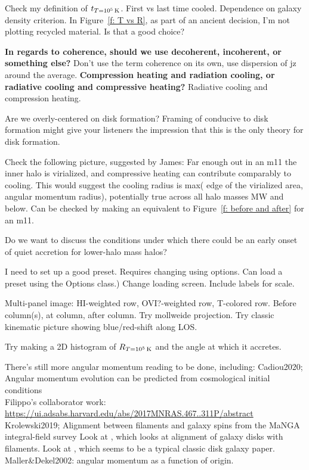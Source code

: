 \documentclass[fleqn,usenatbib]{mnras}
\newcommand{\Rcon}{R_{T=10^5\,{\rm K}}}
\newcommand{\tcon}{t_{T=10^5\,{\rm K}}}
\begin{document}
Check my definition of $\tcon$.
First vs last time cooled.
Dependence on galaxy density criterion.
In Figure~\ref{f: T vs R}, as part of an ancient decision, I'm not plotting recycled material.
Is that a good choice?

\textbf{In regards to coherence, should we use decoherent, incoherent, or something else?}
Don't use the term coherence on its own, use dispersion of jz around the average.
\textbf{Compression heating and radiation cooling, or radiative cooling and compressive heating?}
Radiative cooling and compression heating.

Are we overly-centered on disk formation?
Framing of conducive to disk formation might give your listeners the impression that this is the only theory for disk formation.

Check the following picture, suggested by James:
Far enough out in an m11 the inner halo is virialized, and compressive heating can contribute comparably to cooling.
This would suggest the cooling radius is max( edge of the virialized area, angular momentum radius), potentially true across all halo masses MW and below.
Can be checked by making an equivalent to Figure~\ref{f: before and after} for an m11.

Do we want to discuss the conditions under which there could be an early onset of quiet accretion for lower-halo mass halos?

I need to set up a good preset. Requires changing using options. Can load a preset using the Options class.)
Change loading screen.
Include labels for scale.

Multi-panel image:
HI-weighted row,
OVI?-weighted row,
T-colored row.
Before column(s), at column, after column.
Try mollweide projection.
Try classic kinematic picture showing blue/red-shift along LOS.

Try making a 2D histogram of $\Rcon$ and the angle at which it accretes.

There's still more angular momentum reading to be done, including:
Cadiou2020; Angular momentum evolution can be predicted from cosmological initial conditions\\
Filippo's collaborator work: \url{https://ui.adsabs.harvard.edu/abs/2017MNRAS.467..311P/abstract}\\
Krolewski2019; Alignment between filaments and galaxy spins from the {MaNGA} integral-field survey
Look at \cite{Bird2019}, which looks at alignment of galaxy disks with filaments.
Look at \cite{Bird2020}, which seems to be a typical classic disk galaxy paper.
Maller\&Dekel2002: angular momentum as a function of origin.
\end{document}
